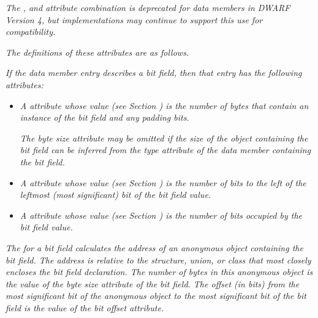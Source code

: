 \textit{The , 
 and 
attribute combination is deprecated for data members in DWARF
Version 4, but implementations may continue to support this
use for compatibility.}

\textit{The 
definitions of these attributes are
as follows.}

\begin{myindentpara}{1cm}
\textit{If the data member entry describes a bit field, then that
entry has the following attributes:}

\begin{itemize}
\item \textit{A  
attribute whose value 
(see Section ) 
is the number of bytes that contain an instance of the
bit field and any padding bits.}

\textit{The byte size attribute may be omitted if the size of the
object containing the bit field can be inferred from the type
attribute of the data member containing the bit field.}

\item \textit{A  
attribute 
whose value 
(see Section ) 
is the number of bits to the left of the leftmost
(most significant) bit of the bit field value.}

\item \textit{A  
attribute 
whose value 
(see Section ) 
is the number of bits occupied by the bit field value.}

\end{itemize}

\textit{The 
 for a bit field calculates the address
of an anonymous object containing the bit field. The address
is relative to the structure, union, or class that most closely
encloses the bit field declaration. The number of bytes in this
anonymous object is the value of the byte size attribute of
the bit field. The offset (in bits) from the most significant
bit of the anonymous object to the most significant bit of
the bit field is the value of the bit offset attribute.}
\end{myindentpara}


